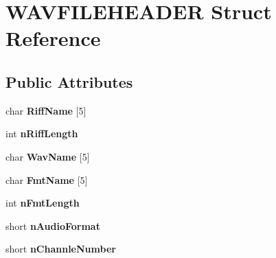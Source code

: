 \hypertarget{struct_w_a_v_f_i_l_e_h_e_a_d_e_r}{}\section{W\+A\+V\+F\+I\+L\+E\+H\+E\+A\+D\+ER Struct Reference}
\label{struct_w_a_v_f_i_l_e_h_e_a_d_e_r}
\subsection*{Public Attributes}
\begin{DoxyCompactItemize}
\item 
\mbox{\label{struct_w_a_v_f_i_l_e_h_e_a_d_e_r_a99f58b7dc2e4308f3f5fa87562fe1726}} 
char {\bfseries Riff\+Name} \mbox{[}5\mbox{]}
\item 
\mbox{\label{struct_w_a_v_f_i_l_e_h_e_a_d_e_r_a473e36446c5b04f49babac0f905788d9}} 
int {\bfseries n\+Riff\+Length}
\item 
\mbox{\label{struct_w_a_v_f_i_l_e_h_e_a_d_e_r_a4d26c2f1bb5e8c3d2e88e4f2a498d369}} 
char {\bfseries Wav\+Name} \mbox{[}5\mbox{]}
\item 
\mbox{\label{struct_w_a_v_f_i_l_e_h_e_a_d_e_r_a7b1e4fd6e6342ddf152857b27f025c9e}} 
char {\bfseries Fmt\+Name} \mbox{[}5\mbox{]}
\item 
\mbox{\label{struct_w_a_v_f_i_l_e_h_e_a_d_e_r_a2f0db99aa4f7b9034f4d20f26dedc4c3}} 
int {\bfseries n\+Fmt\+Length}
\item 
\mbox{\label{struct_w_a_v_f_i_l_e_h_e_a_d_e_r_a17d9aef8cd32f5a9c071852b07692537}} 
short {\bfseries n\+Audio\+Format}
\item 
\mbox{\label{struct_w_a_v_f_i_l_e_h_e_a_d_e_r_a56556c29468b1e68afa3c43ae7449851}} 
short {\bfseries n\+Channle\+Number}
\item 
\mbox{\label{struct_w_a_v_f_i_l_e_h_e_a_d_e_r_a14a5e75c7684880e88f85358e11cb1a5}} 

\end{DoxyCompactItemize}
